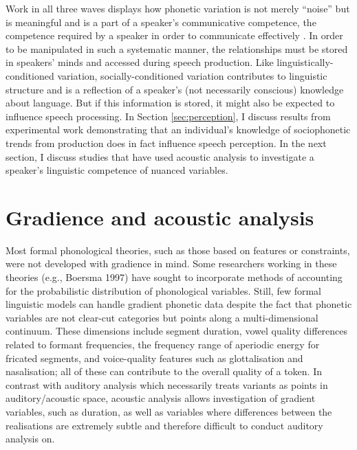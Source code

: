 
Work in all three waves displays how phonetic variation is not merely ``noise'' but is meaningful and is a part of a speaker's communicative competence, the competence required by a speaker in order to communicate effectively \cite{hymes1972}.  In order to be manipulated in such a systematic manner, the relationships must be stored in speakers' minds and accessed during speech production.  Like linguistically-conditioned variation, socially-conditioned variation contributes to linguistic structure and is a reflection of a speaker's (not necessarily conscious) knowledge about language.  But if this information is stored, it might also be expected to influence speech processing.  In Section \ref{sec:perception}, I discuss results from experimental work demonstrating that an individual's knowledge of sociophonetic trends from production does in fact influence speech perception.  In the next section, I discuss studies that have used acoustic analysis to investigate a speaker's linguistic competence of nuanced variables.


\section{Gradience and acoustic analysis}\label{sec:acoustic}
Most formal phonological theories, such as those based on features or constraints, were not developed with gradience in mind.  Some researchers working in these theories (e.g., Boersma 1997) have sought to incorporate methods of accounting for the probabilistic distribution of phonological variables.  Still, few formal linguistic models can handle gradient phonetic data despite the fact that phonetic variables are not clear-cut categories but points along a multi-dimensional continuum.  These dimensions include segment duration, vowel quality differences related to formant frequencies, the frequency range of aperiodic energy for fricated segments, and voice-quality features such as glottalisation and nasalisation; all of these can contribute to the overall quality of a token. In contrast with auditory analysis which necessarily treats variants as points in auditory/acoustic space, acoustic analysis allows investigation of gradient variables, such as duration, as well as variables where differences between the realisations are extremely subtle and therefore difficult to conduct auditory analysis on.   \nocite{boersma1997}

